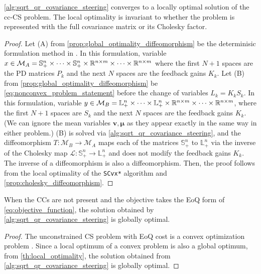 \begin{theorem} \label{th:local_optimality}
	\cref{alg:sqrt_qr_covariance_steering} converges to a locally optimal solution of the cc-CS problem. The local optimality is invariant to whether the problem is represented with the full covariance matrix or its Cholesky factor. 
\end{theorem}

\begin{proof}
	Let (A) from \cref{prop:global_optimality_diffeomorphism} be the determinisic formulation method in \cite{liuOptimalCovarianceSteering2025}. In this formulation, variable $x \in \mathcal{M}_A = \mathbb{S}_+^n \times \cdots \times \mathbb{S}_+^n \times \mathbb{R}^{n\times m} \times \cdots \times \mathbb{R}^{n \times m}$ where the first $N+1$ spaces are the PD matrices $P_k$ and the next $N$ spaces are the feedback gains $K_k$. 
	Let (B) from \cref{prop:global_optimality_diffeomorphism} be \cref{eq:nonconvex_problem_statement} before the change of variables $L_k = K_k S_k$. In this formulation, variable $y \in \mathcal{M}_B = \mathbb{L}_+^n \times \cdots \times \mathbb{L}_+^n \times \mathbb{R}^{n\times m} \times \cdots \times \mathbb{R}^{n \times m}$, where the first $N+1$ spaces are $S_k$ and the next $N$ spaces are the feedback gains $K_k$. (We can ignore the mean variables $\bm{v}, \bm{\mu}$ as they appear exactly in the same way in either problem.)
	(B) is solved via \cref{alg:sqrt_qr_covariance_steering}, and the diffeomorphism $T: \mathcal{M}_B \rightarrow \mathcal{M}_A$ maps each of the matrices $\mathbb{S}_+^n$ to $\mathbb{L}_+^n$ via the inverse of the Cholesky map \(\mathcal{L} : \mathbb{S}^n_+ \rightarrow \mathbb{L}_+^n\) and does not modify the feedback gains $K_k$. The inverse of a diffeomorphism is also a diffeomorphism.
	Then, the proof follows from the local optimality of the \texttt{SCvx*} algorithm \cite[Theorem 3]{oguriSuccessiveConvexificationFeasibility2023a} and \cref{prop:cholesky_diffeomorphism}. 
\end{proof}


\begin{theorem} \label{th:global_optimality}
	When the CCs are not present and the objective takes the EoQ form of \cref{eq:objective_function}, the solution obtained by \cref{alg:sqrt_qr_covariance_steering} is globally optimal.
\end{theorem}
\begin{proof}
	The unconstrained CS problem with EoQ cost is a convex optimization problem \cite{liuOptimalCovarianceSteering2025}. Since a local optimum of a convex problem is also a global optimum, from \cref{th:local_optimality}, the solution obtained from \cref{alg:sqrt_qr_covariance_steering} is globally optimal.
\end{proof}